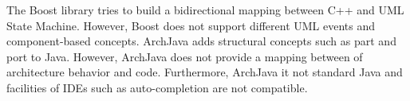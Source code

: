\noindent
{}
The Boost library \cite{boost} tries to build a bidirectional mapping between C++ and UML State Machine.
However, Boost does not support different UML events and component-based concepts.
ArchJava \cite{aldrich2002archjava} adds structural concepts such as part and port to Java. %
However, ArchJava does not provide a mapping between of architecture behavior and code.
Furthermore, ArchJava it not standard Java and facilities of IDEs such as auto-completion are not compatible.%





%